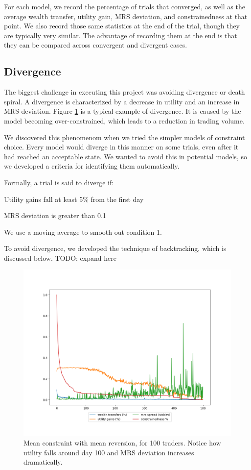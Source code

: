 \documentclass[12pt,a4paper,titlepage]{article}
\begin{document}
For each model, we record the percentage of trials that converged, as well as the average wealth transfer, utility gain, MRS deviation, and constrainedness at that point.
We also record those same statistics at the end of the trial, though they are typically very similar.
The advantage of recording them at the end is that they can be compared across convergent and divergent cases.

\subsection{Divergence}
The biggest challenge in executing this project was avoiding divergence or death spiral.
A divergence is characterized by a decrease in utility and an increase in MRS deviation.
Figure \ref{fig:div} is a typical example of divergence. 
It is caused by the model becoming over-constrained, which leads to a reduction in trading volume.

We discovered this phenomenom when we tried the simpler models of constraint choice.
Every model would diverge in this manner on some trials, even after it had reached an acceptable state.
We wanted to avoid this in potential models, so we developed a criteria for identifying them automatically.

Formally, a trial is said to diverge if:
\begin{description}[align=right,labelwidth=2cm,font=\normalfont]
\item[1.] Utility gains fall at least 5\% from the first day 
\item[AND 2.] MRS deviation is greater than 0.1 
\end{description}
We use a moving average to smooth out condition 1.
    
To avoid divergence, we developed the technique of backtracking, which is discussed below.
TODO: expand here

\begin{figure}[h]
    \centering
    \includegraphics[width=\textwidth]{seed_0.png}
    \caption{
      Mean constraint with mean reversion, for 100 traders.
      Notice how utility falls around day 100 and MRS deviation increases dramatically.
    }
    \label{fig:div}
\end{figure}
\end{document}
